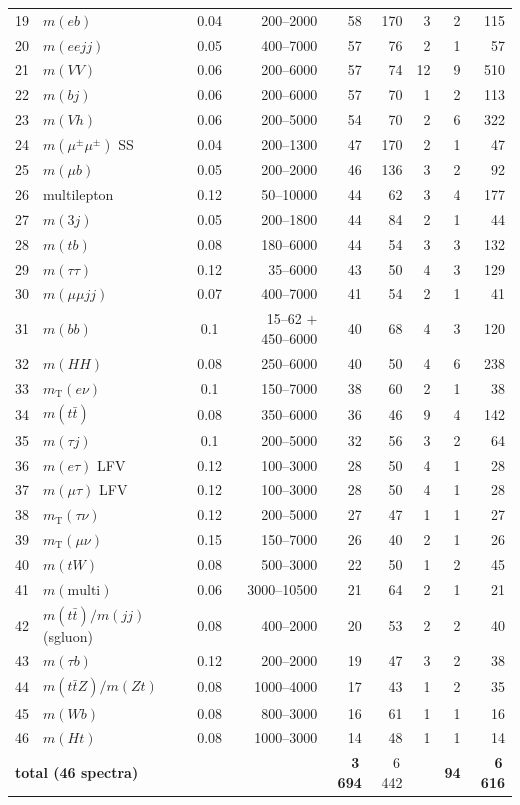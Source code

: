\begin{table}[htbp]
\begin{tabular}{rlcrrrrrr}
19 & $m(eb)$ & 0.04 & 200--2000 & 58 & 170 & 3 & 2 & 115\\
20 & $m(eejj)$ & 0.05 & 400--7000 & 57 & 76 & 2 & 1 & 57\\
21 & $m(VV)$ & 0.06 & 200--6000 & 57 & 74 & 12 & 9 & 510\\
22 & $m(bj)$ & 0.06 & 200--6000 & 57 & 70 & 1 & 2 & 113\\
23 & $m(Vh)$ & 0.06 & 200--5000 & 54 & 70 & 2 & 6 & 322\\
24 & $m(\mu^\pm\mu^\pm)$ SS & 0.04 & 200--1300 & 47 & 170 & 2 & 1 & 47\\
25 & $m(\mu b)$ & 0.05 & 200--2000 & 46 & 136 & 3 & 2 & 92\\
26 & multilepton & 0.12 & 50--10000 & 44 & 62 & 3 & 4 & 177\\
27 & $m(3j)$ & 0.05 & 200--1800 & 44 & 84 & 2 & 1 & 44\\
28 & $m(tb)$ & 0.08 & 180--6000 & 44 & 54 & 3 & 3 & 132\\
29 & $m(\tau\tau)$ & 0.12 & 35--6000 & 43 & 50 & 4 & 3 & 129\\
30 & $m(\mu\mu jj)$ & 0.07 & 400--7000 & 41 & 54 & 2 & 1 & 41\\
31 & $m(bb)$ & 0.1 & 15--62 $+$ 450--6000 & 40 & 68 & 4 & 3 & 120\\
32 & $m(HH)$ & 0.08 & 250--6000 & 40 & 50 & 4 & 6 & 238\\
33 & $m_{\mathrm{T}}(e\nu)$ & 0.1 & 150--7000 & 38 & 60 & 2 & 1 & 38\\
34 & $m(t\bar t)$ & 0.08 & 350--6000 & 36 & 46 & 9 & 4 & 142\\
35 & $m(\tau j)$ & 0.1 & 200--5000 & 32 & 56 & 3 & 2 & 64\\
36 & $m(e\tau)$ LFV & 0.12 & 100--3000 & 28 & 50 & 4 & 1 & 28\\
37 & $m(\mu\tau)$ LFV & 0.12 & 100--3000 & 28 & 50 & 4 & 1 & 28\\
38 & $m_{\mathrm{T}}(\tau\nu)$ & 0.12 & 200--5000 & 27 & 47 & 1 & 1 & 27\\
39 & $m_{\mathrm{T}}(\mu\nu)$ & 0.15 & 150--7000 & 26 & 40 & 2 & 1 & 26\\
40 & $m(tW)$ & 0.08 & 500--3000 & 22 & 50 & 1 & 2 & 45\\
41 & $m(\mathrm{multi})$ & 0.06 & 3000--10500 & 21 & 64 & 2 & 1 & 21\\
42 & $m(t\bar t)/m(jj)$ (sgluon) & 0.08 & 400--2000 & 20 & 53 & 2 & 2 & 40\\
43 & $m(\tau b)$ & 0.12 & 200--2000 & 19 & 47 & 3 & 2 & 38\\
44 & $m(t\bar tZ)/m(Zt)$ & 0.08 & 1000--4000 & 17 & 43 & 1 & 2 & 35\\
45 & $m(Wb)$ & 0.08 & 800--3000 & 16 & 61 & 1 & 1 & 16\\
46 & $m(Ht)$ & 0.08 & 1000--3000 & 14 & 48 & 1 & 1 & 14\\
\midrule
\multicolumn{4}{l}{\textbf{total (46 spectra)}} & \textbf{3\,694} & 6\,442 & & \textbf{94} & \textbf{6\,616}\\
\bottomrule
\end{tabular}
\end{table}

